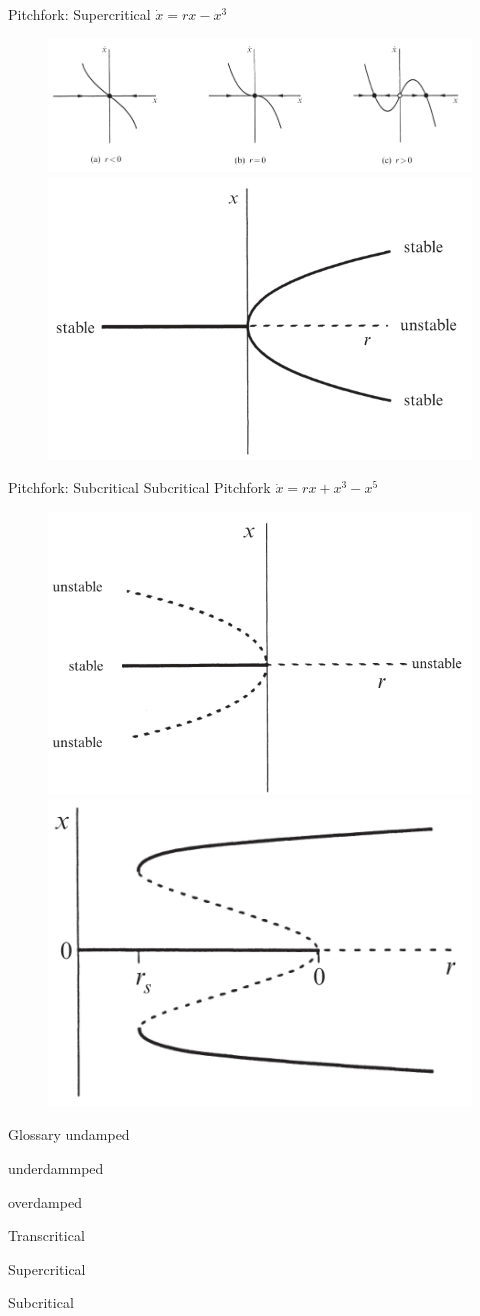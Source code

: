 \documentclass[9pt,aspectratio=43,mathserif,table]{beamer}
\begin{document}
\begin{frame}{Pitchfork: Supercritical}
    $\dot x = rx - x ^3$
     \begin{figure}[!h]
      \centering
      \includegraphics[width=.8\textwidth]{fig/supercriticalPitchfork.PNG}
      \includegraphics[width=.4\textwidth]{fig/supercriticalPitchfork_bifurcation.PNG}
      \caption{}
    \end{figure}
 
\end{frame}
\begin{frame}{Pitchfork: Subcritical}
     Subcritical Pitchfork $\dot x = rx + x^3 - x^5$
   
    \begin{figure}[!h]
      \centering
      \includegraphics[width=.5\textwidth]{fig/subcritical_bifurcation_unstable.png}
      \includegraphics[width=.4\textwidth]{fig/subcritical_bifurcation.png}
    \end{figure}
 
\end{frame}
\begin{frame}{Glossary}
  undamped

  underdammped

  overdamped

  Transcritical

  Supercritical

  Subcritical
   
\end{frame}
\end{document}
